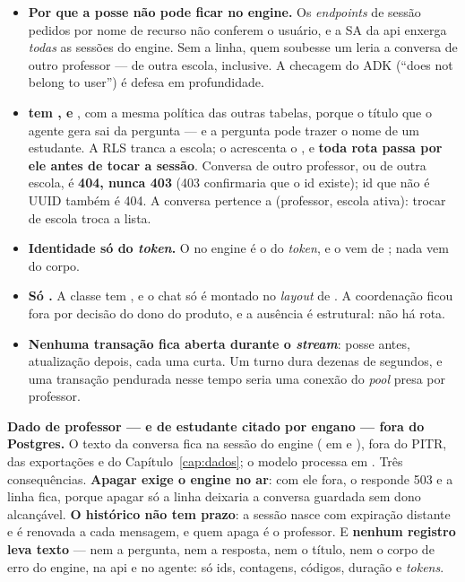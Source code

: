 \begin{itemize}
  \item \textbf{Por que a posse não pode ficar no engine.} Os \emph{endpoints} de
    sessão pedidos por nome de recurso não conferem o usuário, e a SA da api
    enxerga \emph{todas} as sessões do engine. Sem a linha, quem soubesse um
     leria a conversa de outro professor --- de outra escola,
    inclusive. A checagem do ADK (\enquote{does not belong to user}) é defesa em
    profundidade.
  \item \textbf{ tem ,
     e }, com a mesma política das outras
    tabelas, porque o título que o agente gera sai da pergunta --- e a pergunta
    pode trazer o nome de um estudante. A RLS tranca a escola; o 
    acrescenta o , e \textbf{toda rota passa por ele antes de
    tocar a sessão}. Conversa de outro professor, ou de outra escola, é
    \textbf{404, nunca 403} (403 confirmaria que o id existe); id que não é UUID
    também é 404. A conversa pertence a (professor, escola ativa): trocar de
    escola troca a lista.
  \item \textbf{Identidade só do \emph{token}.} O  no engine é o
     do \emph{token}, e o  vem de
    ; nada vem do corpo.
  \item \textbf{Só .} A classe tem , e o chat
    só é montado no \emph{layout} de . A coordenação ficou fora por
    decisão do dono do produto, e a ausência é estrutural: não há rota.
  \item \textbf{Nenhuma transação  fica aberta durante o
    \emph{stream}}: posse antes, atualização depois, cada uma curta. Um turno dura
    dezenas de segundos, e uma transação pendurada nesse tempo seria uma conexão
    do \emph{pool} presa por professor.
\end{itemize}

\begin{atencao}
\textbf{Dado de professor --- e de estudante citado por engano --- fora do
Postgres.} O texto da conversa fica na sessão do engine ( em
 e ), fora do PITR, das exportações e do Capítulo~\ref{cap:dados};
o modelo processa em . Três consequências. \textbf{Apagar exige o
engine no ar}: com ele fora, o  responde 503 e a linha fica, porque
apagar só a linha deixaria a conversa guardada sem dono alcançável. \textbf{O
histórico não tem prazo}: a sessão nasce com expiração distante e é renovada a
cada mensagem, e quem apaga é o professor. E \textbf{nenhum registro leva texto}
--- nem a pergunta, nem a resposta, nem o título, nem o corpo de erro do engine,
na api e no agente: só ids, contagens, códigos, duração e \emph{tokens}.
\end{atencao}

